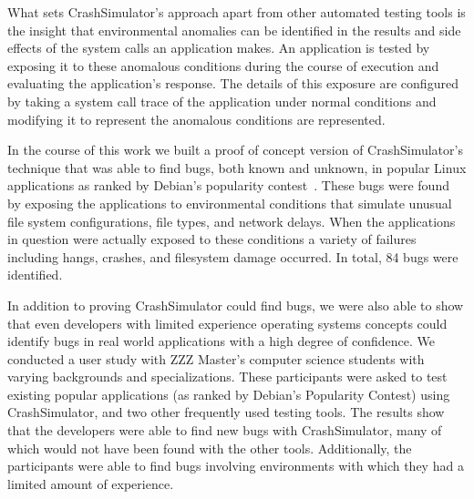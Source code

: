 %

What sets CrashSimulator's approach apart from other automated testing
tools is the insight that environmental anomalies can be identified
in the results and side effects of the system calls an application makes.
An application is tested by exposing it to these anomalous
conditions during the course of execution and evaluating the application's
response.  The details of this exposure are configured by taking a
system call trace of the application under normal conditions and modifying
it to represent the anomalous conditions are represented.

In the course of this work we built a proof of concept version of
CrashSimulator's technique that was able to find bugs, both known and
unknown, in popular Linux applications as ranked by Debian's popularity
contest~\cite{DebPopCon}.  These bugs were found by exposing the
applications to environmental conditions that simulate unusual file system
configurations, file types, and network delays.  When the applications in
question were actually exposed to these conditions a variety of failures
including hangs, crashes, and filesystem damage occurred.  In total, 84
bugs were identified.

In addition to proving CrashSimulator could find bugs, we were also able to
show that even developers with limited experience operating systems
concepts could identify bugs in real world applications with a high degree
of confidence.
We conducted a user study with
ZZZ Master's computer
science students with varying backgrounds and specializations.  These
participants were asked to test existing popular applications (as ranked by
Debian's Popularity Contest) using CrashSimulator, and two other frequently
used testing tools.
The results show that the developers were able to find new bugs with
CrashSimulator, many of which would not have been found with the other
tools.  Additionally, the
participants were able to find bugs
involving environments with which they had a limited amount of experience.

